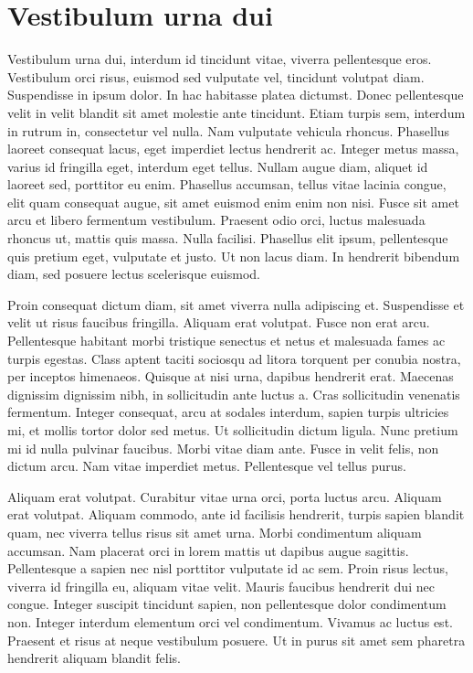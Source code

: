 \section{Vestibulum urna dui}
Vestibulum urna dui, interdum id tincidunt vitae, viverra pellentesque eros.
Vestibulum orci risus, euismod sed vulputate vel, tincidunt volutpat diam.
Suspendisse in ipsum dolor.
In hac habitasse platea dictumst.
Donec pellentesque velit in velit blandit sit amet molestie ante tincidunt.
Etiam turpis sem, interdum in rutrum in, consectetur vel nulla.
Nam vulputate vehicula rhoncus.
Phasellus laoreet consequat lacus, eget imperdiet lectus hendrerit ac.
Integer metus massa, varius id fringilla eget, interdum eget tellus.
Nullam augue diam, aliquet id laoreet sed, porttitor eu enim.
Phasellus accumsan, tellus vitae lacinia congue, elit quam consequat augue, sit amet euismod enim enim non nisi.
Fusce sit amet arcu et libero fermentum vestibulum.
Praesent odio orci, luctus malesuada rhoncus ut, mattis quis massa.
Nulla facilisi.
Phasellus elit ipsum, pellentesque quis pretium eget, vulputate et justo.
Ut non lacus diam.
In hendrerit bibendum diam, sed posuere lectus scelerisque euismod.

Proin consequat dictum diam, sit amet viverra nulla adipiscing et.
Suspendisse et velit ut risus faucibus fringilla.
Aliquam erat volutpat.
Fusce non erat arcu.
Pellentesque habitant morbi tristique senectus et netus et malesuada fames ac turpis egestas.
Class aptent taciti sociosqu ad litora torquent per conubia nostra, per inceptos himenaeos.
Quisque at nisi urna, dapibus hendrerit erat.
Maecenas dignissim dignissim nibh, in sollicitudin ante luctus a.
Cras sollicitudin venenatis fermentum.
Integer consequat, arcu at sodales interdum, sapien turpis ultricies mi, et mollis tortor dolor sed metus.
Ut sollicitudin dictum ligula.
Nunc pretium mi id nulla pulvinar faucibus.
Morbi vitae diam ante.
Fusce in velit felis, non dictum arcu.
Nam vitae imperdiet metus.
Pellentesque vel tellus purus.

Aliquam erat volutpat.
Curabitur vitae urna orci, porta luctus arcu.
Aliquam erat volutpat.
Aliquam commodo, ante id facilisis hendrerit, turpis sapien blandit quam, nec viverra tellus risus sit amet urna.
Morbi condimentum aliquam accumsan.
Nam placerat orci in lorem mattis ut dapibus augue sagittis.
Pellentesque a sapien nec nisl porttitor vulputate id ac sem.
Proin risus lectus, viverra id fringilla eu, aliquam vitae velit.
Mauris faucibus hendrerit dui nec congue.
Integer suscipit tincidunt sapien, non pellentesque dolor condimentum non.
Integer interdum elementum orci vel condimentum.
Vivamus ac luctus est.
Praesent et risus at neque vestibulum posuere.
Ut in purus sit amet sem pharetra hendrerit aliquam blandit felis.

